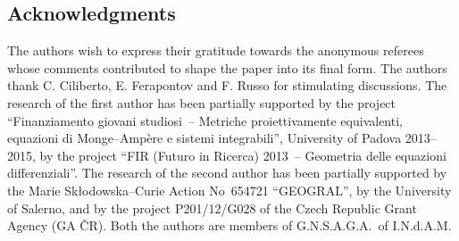 \documentclass[pdftex]{sigma}
\numberwithin{equation}{section}
\begin{document}
\subsection*{Acknowledgments}
The authors wish to express their gratitude towards the anonymous referees whose comments contributed to shape the paper into its f\/inal form.
The authors thank C. Ciliberto, E. Ferapontov and F. Russo for stimulating discussions. The research of the f\/irst author has been partially supported by the project ``Finanziamento giovani studiosi~-- Metriche proiettivamente equiva\-lenti, equazioni di Monge--Amp\`ere e sistemi integrabili'', University of Padova 2013--2015, by the project ``FIR (Futuro in Ricerca) 2013~-- Geometria delle equazioni dif\/ferenziali''. The research of the second author has been partially supported by the Marie Sk{\l}odowska--Curie Action No~654721 ``GEOGRAL'', by the University of Salerno, and by the project P201/12/G028 of the Czech Republic Grant Agency (GA \v{C}R). Both the authors are members of G.N.S.A.G.A.\ of I.N.d.A.M.
\end{document}
